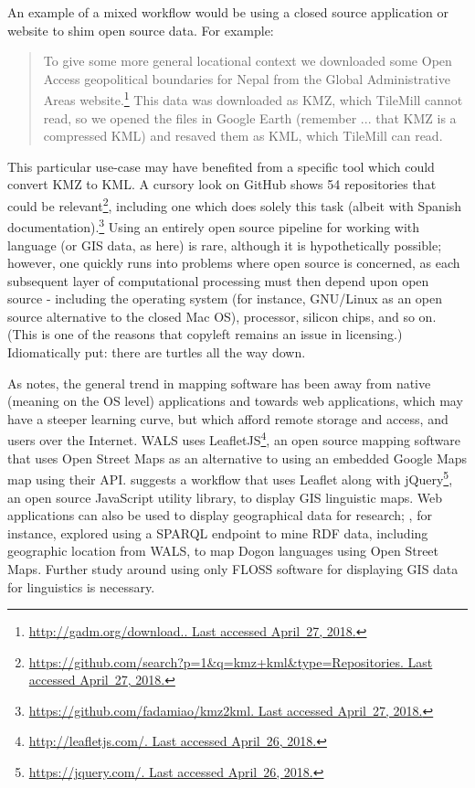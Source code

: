 An example of a mixed workflow would be using a closed source application or website to shim open source data. For example:

\begin{quote}
To give some more general locational context we downloaded some Open Access geopolitical boundaries for Nepal from the Global Administrative Areas website.\footnote{\href{http://gadm.org/download.}{http://gadm.org/download.. Last accessed April~27, 2018.}} This data was downloaded as KMZ, which TileMill cannot read, so we opened the files in Google Earth (remember ... that KMZ is a compressed KML) and resaved them as KML, which TileMill can read. \citep[228]{gawne2016mapmaking}
\end{quote}

This particular use-case may have benefited from a specific tool which could convert KMZ to KML. A cursory look on GitHub shows 54 repositories that could be relevant\footnote{\href{https://github.com/search?p=1&q=kmz+kml&type=Repositories}{https://github.com/search?p=1\&q=kmz+kml\&type=Repositories. Last accessed April~27, 2018.}}, including one which does solely this task (albeit with Spanish documentation).\footnote{\href{https://github.com/fadamiao/kmz2kml}{https://github.com/fadamiao/kmz2kml. Last accessed April~27, 2018.}} Using an entirely open source pipeline for working with language (or GIS data, as here) is rare, although it is hypothetically possible; however, one quickly runs into problems where open source is concerned, as each subsequent layer of computational processing must then depend upon open source - including the operating system (for instance, GNU/Linux as an open source alternative to the closed Mac OS), processor, silicon chips, and so on. (This is one of the reasons that copyleft remains an issue in licensing.) Idiomatically put: there are turtles all the way down.

As \citet{hu2012multimedia, hu2018web} notes, the general trend in mapping software has been away from native (meaning on the OS level) applications and towards web applications, which may have a steeper learning curve, but which afford remote storage and access, and users over the Internet. WALS uses LeafletJS\footnote{\href{http://leafletjs.com/}{http://leafletjs.com/. Last accessed April~26, 2018.}}, an open source mapping software that uses Open Street Maps as an alternative to using an embedded Google Maps map using their API. \citet{hu2018web} suggests a workflow that uses Leaflet along with jQuery\footnote{\href{https://jquery.com/}{https://jquery.com/. Last accessed April~26, 2018.}}, an open source JavaScript utility library, to display GIS linguistic maps. Web applications can also be used to display geographical data for research; \citet{littauer2013linguistic}, for instance, explored using a SPARQL endpoint to mine RDF data, including geographic location from WALS, to map Dogon languages using Open Street Maps. Further study around using only FLOSS software for displaying GIS data for linguistics is necessary.

